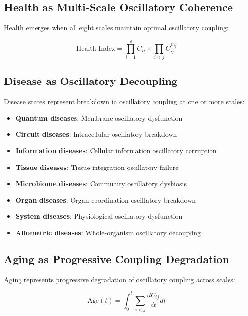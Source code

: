 \documentclass[twocolumn]{article}
\begin{document}
\subsection{Health as Multi-Scale Oscillatory Coherence}

Health emerges when all eight scales maintain optimal oscillatory coupling:

\begin{equation}
\text{Health Index} = \prod_{i=1}^{8} C_{ii} \times \prod_{i<j} C_{ij}^{w_{ij}}
\end{equation}

\subsection{Disease as Oscillatory Decoupling}

Disease states represent breakdown in oscillatory coupling at one or more scales:

\begin{definition}
\begin{itemize}
\item \textbf{Quantum diseases}: Membrane oscillatory dysfunction
\item \textbf{Circuit diseases}: Intracellular oscillatory breakdown
\item \textbf{Information diseases}: Cellular information oscillatory corruption
\item \textbf{Tissue diseases}: Tissue integration oscillatory failure
\item \textbf{Microbiome diseases}: Community oscillatory dysbiosis
\item \textbf{Organ diseases}: Organ coordination oscillatory breakdown
\item \textbf{System diseases}: Physiological oscillatory dysfunction
\item \textbf{Allometric diseases}: Whole-organism oscillatory decoupling
\end{itemize}
\end{definition}

\subsection{Aging as Progressive Coupling Degradation}

Aging represents progressive degradation of oscillatory coupling across scales:

\begin{equation}
\text{Age}(t) = \int_0^t \sum_{i<j} \frac{dC_{ij}}{dt} dt
\end{equation}
\end{document}
